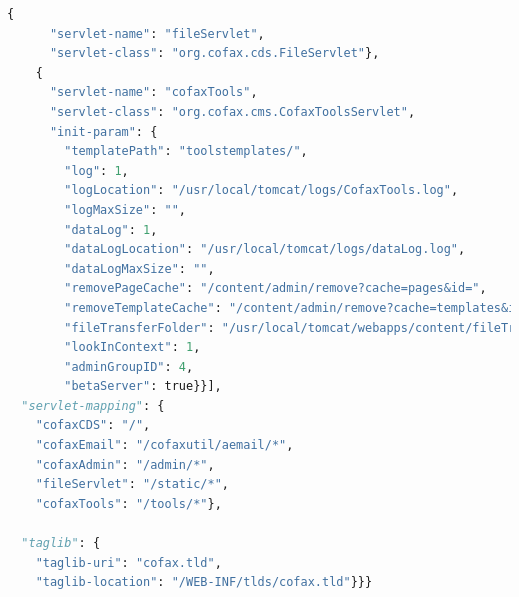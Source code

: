 \documentclass[a4paper,11pt]{book}
\begin{document}
\begin{lstlisting}[language=python,caption={make testServlet }]
    {
      "servlet-name": "fileServlet",
      "servlet-class": "org.cofax.cds.FileServlet"},
    {
      "servlet-name": "cofaxTools",
      "servlet-class": "org.cofax.cms.CofaxToolsServlet",
      "init-param": {
        "templatePath": "toolstemplates/",
        "log": 1,
        "logLocation": "/usr/local/tomcat/logs/CofaxTools.log",
        "logMaxSize": "",
        "dataLog": 1,
        "dataLogLocation": "/usr/local/tomcat/logs/dataLog.log",
        "dataLogMaxSize": "",
        "removePageCache": "/content/admin/remove?cache=pages&id=",
        "removeTemplateCache": "/content/admin/remove?cache=templates&id=",
        "fileTransferFolder": "/usr/local/tomcat/webapps/content/fileTransferFolder",
        "lookInContext": 1,
        "adminGroupID": 4,
        "betaServer": true}}],
  "servlet-mapping": {
    "cofaxCDS": "/",
    "cofaxEmail": "/cofaxutil/aemail/*",
    "cofaxAdmin": "/admin/*",
    "fileServlet": "/static/*",
    "cofaxTools": "/tools/*"},

  "taglib": {
    "taglib-uri": "cofax.tld",
    "taglib-location": "/WEB-INF/tlds/cofax.tld"}}}


\end{lstlisting}
\end{document}
